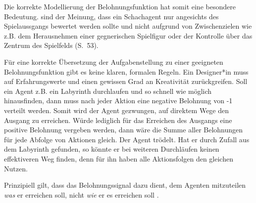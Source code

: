 \par 
Die korrekte Modellierung der Belohnungsfunktion hat somit eine besondere Bedeutung. \cite{Sutton1998} sind der Meinung, dass ein Schachagent nur angesichts des Spielaussgangs bewertet werden sollte und nicht aufgrund von Zwischenzielen wie z.B. dem Herausnehmen einer gegnerischen Spielfigur oder der Kontrolle über das Zentrum des Spielfelds (S.~53). 
\par 
Für eine korrekte Übersetzung der Aufgabenstellung zu einer geeigneten Belohnungsfunktion gibt es keine klaren, formalen Regeln. Ein Designer*in muss auf Erfahrungswerte und einen gewissen Grad an Kreativität zurückgreifen. Soll ein Agent z.B. ein Labyrinth durchlaufen und so schnell wie möglich hinausfinden, dann muss nach jeder Aktion eine negative Belohnung von -1 verteilt werden. Somit wird der Agent gezwungen, auf direktem Wege den Ausgang zu erreichen. Würde lediglich für das Erreichen des Ausgangs eine positive Belohnung vergeben werden, dann wäre die Summe aller Belohnungen für jede Abfolge von Aktionen gleich. Der Agent \glqq trödelt\grqq{}. Hat er durch Zufall aus dem Labyrinth gefunden, so könnte er bei weiteren Durchläufen keinen effektiveren Weg finden, denn für ihn haben alle Aktionsfolgen den gleichen Nutzen.
\par
Prinzipiell gilt, dass \glqq das Belohnungssignal dazu dient, dem Agenten mitzuteilen \textit{was} er erreichen soll, nicht \textit{wie} er es erreichen soll\grqq{} \cite[S.~54]{Sutton1998}.